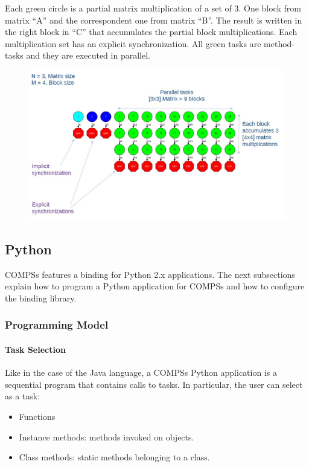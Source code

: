 Each green circle is a partial matrix multiplication of a set of 3. One block from matrix ``A'' and the correspondent one from matrix ``B''. The result is written in the right block in ``C'' that accumulates the partial block multiplications. Each multiplication set has an explicit synchronization. All green tasks are method-tasks and they are executed in parallel.

\begin{figure}[ht!]
  \centering
    \includegraphics[width=1.0\textwidth]{./Sections/6_Bindings/Figures/matmul.jpeg}
\end{figure}

\subsection{Python}

COMPSs features a binding for Python 2.x applications. The next subsections explain how to program a Python application for COMPSs and how to configure the binding library.

\subsubsection{Programming Model}

\paragraph{Task Selection}

Like in the case of the Java language, a COMPSs Python application is a sequential program that contains calls to tasks. In particular, the user can select as a task:

\begin{itemize}
 \item Functions
 \item Instance methods: methods invoked on objects.
 \item Class methods: static methods belonging to a class.
\end{itemize}

